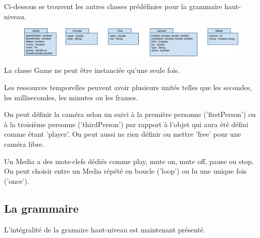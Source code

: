 Ci-dessous se trouvent les autres classes prédéfinies pour la grammaire haut-niveau.

\begin{figure}[h]
 \centering
 \includegraphics[width=\textwidth]{img/otherclass}
\end{figure}

La classe Game ne peut être instanciée qu'une seule fois.

Les ressources temporelles peuvent avoir plusieurs unités telles que les secondes, les millisecondes, les minutes ou les frames.

On peut définir la caméra selon un suivi à la première personne ('firstPerson') ou à la troisième personne ('thirdPerson') par rapport 
à l'objet qui aura été défini comme étant 'player'.
On peut aussi ne rien définir ou mettre 'free' pour une caméra libre.

Un Media a des mots-clefs dédiés comme play, mute on, mute off, pause ou stop.
On peut choisir entre un Media répété en boucle ('loop') ou lu une unique fois ('once').

\subsection{La grammaire}

L'intégralité de la gramaire haut-niveau est maintenant présenté.

